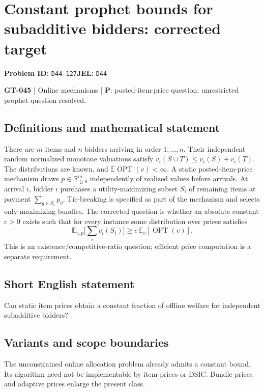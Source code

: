 \documentclass[11pt,a4paper]{article}
\begin{document}
\section*{Constant prophet bounds for subadditive bidders: corrected target}
\textbf{Problem ID:} \texttt{D44-127}\quad \textbf{JEL:} \texttt{D44}\par
\label{problem:OP-0175}
\label{game:GT-045}
{\sffamily\small\color{muted}
\textbf{GT-045} | Online mechanisms | \textbf{P}: posted-item-price question; unrestricted prophet question resolved.
\par}
\subsection*{Definitions and mathematical statement}
There are $m$ items and $n$ bidders arriving in order $1,\ldots,n$. Their independent random normalized monotone valuations satisfy $v_i(S\cup T)\leq v_i(S)+v_i(T)$. The distributions are known, and $\mathbb E\operatorname{OPT}(v)<\infty$. A static posted-item-price mechanism draws $p\in\mathbb R_{\geq0}^m$ independently of realized values before arrivals. At arrival $i$, bidder $i$ purchases a utility-maximizing subset $S_i$ of remaining items at payment $\sum_{g\in S_i}p_g$. Tie-breaking is specified as part of the mechanism and selects only maximizing bundles. The corrected question is whether an absolute constant $c>0$ exists such that for every instance some distribution over prices satisfies
\[
 \mathbb E_{v,p}\Big[\sum_i v_i(S_i)\Big]\geq c\,\mathbb E_v[\operatorname{OPT}(v)].
\]
This is an existence/competitive-ratio question; efficient price computation is a separate requirement.
\subsection*{Short English statement}
Can static item prices obtain a constant fraction of offline welfare for independent subadditive bidders?
\subsection*{Variants and scope boundaries}
The unconstrained online allocation problem already admits a constant bound. Its algorithm need not be implementable by item prices or DSIC. Bundle prices and adaptive prices enlarge the present class.
\end{document}
